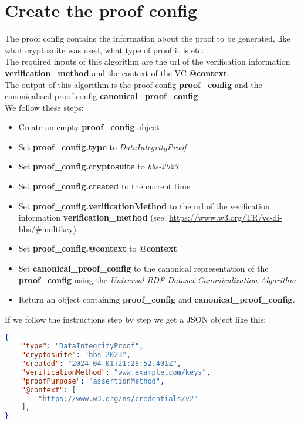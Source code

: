 \documentclass[
	a4paper               %
	,bibliography=totoc   %
	,listof=totoc         %
	,monolingual
]{bfhthesis}              %
\begin{document}
\section{Create the proof config}
\label{subsubsec:proof_config}
The proof config contains the information about the proof to be generated, like what cryptosuite was used, what type of proof it is etc.\\

The required inputs of this algorithm are the url of the verification information \textbf{verification\_method} and the context of the VC \textbf{@context}.\\

The output of this algorithm is the proof config \textbf{proof\_config} and the canonicalised proof config \textbf{canonical\_proof\_config}.\\

We follow these steps:
\begin{itemize}
	\item Create an empty \textbf{proof\_config} object
	\item Set \textbf{proof\_config.type} to \textit{DataIntegrityProof}
	\item Set \textbf{proof\_config.cryptosuite} to \textit{bbs-2023}
	\item Set \textbf{proof\_config.created} to the current time
	\item Set \textbf{proof\_config.verificationMethod} to the url of the verification information \textbf{verification\_method} (see: \url{https://www.w3.org/TR/vc-di-bbs/#multikey})
	\item Set \textbf{proof\_config.@context} to \textbf{@context}
	\item Set \textbf{canonical\_proof\_config} to the canonical representation of the \textbf{proof\_config} using the \textit{Universal RDF Dataset Canonicalization Algorithm}\cite{rdf}
	\item Return an object containing \textbf{proof\_config} and \textbf{canonical\_proof\_config}.
\end{itemize}

If we follow the instructions step by step we get a JSON object like this:
\begin{lstlisting}[language=json,firstnumber=1,caption={Example Proof Config},captionpos=b]
{
	"type": "DataIntegrityProof",
	"cryptosuite": "bbs-2023",
	"created": "2024-04-01T21:28:52.401Z",
	"verificationMethod": "www.example.com/keys",
	"proofPurpose": "assertionMethod",
	"@context": [
		"https://www.w3.org/ns/credentials/v2"
	],
}
\end{lstlisting}\newpage
\end{document}
